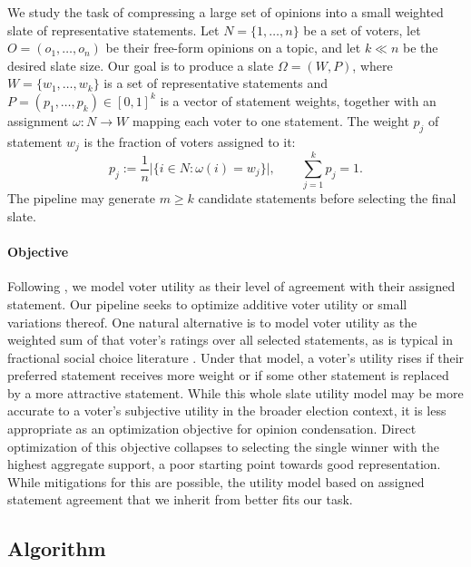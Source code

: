\documentclass[11pt]{article}
\begin{document}
We study the task of compressing a large set of opinions into a small weighted slate of representative statements. Let \(N=\{1,\ldots,n\}\) be a set of voters, let \(O=(o_1,\ldots,o_n)\) be their free-form opinions on a topic, and let \(k \ll n\) be the desired slate size. Our goal is to produce a slate \(\Omega=(W,P)\), where \(W=\{w_1,\ldots,w_k\}\) is a set of representative statements and \(P=(p_1,\ldots,p_k)\in[0,1]^k\) is a vector of statement weights, together with an assignment \(\omega:N\to W\) mapping each voter to one statement. The weight \(p_j\) of statement \(w_j\) is the fraction of voters assigned to it:
\[
p_j:=\frac{1}{n}\bigl|\{i\in N:\omega(i)=w_j\}\bigr|,
\qquad
\sum_{j=1}^k p_j = 1.
\]
The pipeline may generate \(m \ge k\) candidate statements before selecting the final slate.

\paragraph{Objective}
Following \citet{fish-v2}, we model voter utility as their level of agreement with their assigned statement. Our pipeline seeks to optimize additive voter utility or small variations thereof. One natural alternative is to model voter utility as the weighted sum of that voter's ratings over all selected statements, as is typical in fractional social choice literature \citep{rangevoting-rrv, aziz-randomized-2015, brandt_rolling_2017}. Under that model, a voter's utility rises if their preferred statement receives more weight or if some other statement is replaced by a more attractive statement. While this whole slate utility model may be more accurate to a voter's subjective utility in the broader election context, it is less appropriate as an optimization objective for opinion condensation. Direct optimization of this objective collapses to selecting the single winner with the highest aggregate support, a poor starting point towards good representation. While mitigations for this are possible, the utility model based on assigned statement agreement that we inherit from \citet{fish-v2} better fits our task.

\subsection{Algorithm}
\end{document}
